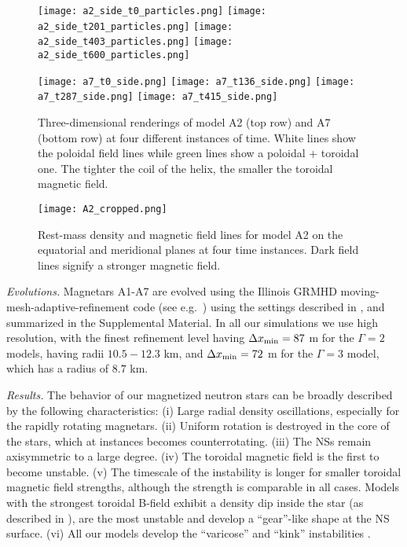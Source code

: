 \documentclass[twocolumn,superscriptaddress,showpacs,prl,aps,amsmath,amssymb,nofootinbib]{revtex4-1}
\begin{document}
\begin{figure*} 
\begin{center} 
\texttt{[image: a2\_side\_t0\_particles.png]}
\texttt{[image: a2\_side\_t201\_particles.png]}
\texttt{[image: a2\_side\_t403\_particles.png]}
\texttt{[image: a2\_side\_t600\_particles.png]}

\vspace{0.1cm}

\texttt{[image: a7\_t0\_side.png]}
\texttt{[image: a7\_t136\_side.png]}
\texttt{[image: a7\_t287\_side.png]}
\texttt{[image: a7\_t415\_side.png]}
\caption{Three-dimensional renderings of model A2 (top row) and A7 (bottom row)
at four different instances of time.  White lines show the poloidal field lines
while green lines show a poloidal + toroidal one. The tighter the coil of the
helix, the smaller the toroidal magnetic field.}
\label{fig:A27}
\end{center}
\end{figure*}


\begin{figure*} 
\begin{center}
\texttt{[image: A2\_cropped.png]}
\caption{Rest-mass density and magnetic field lines for model A2 on the
equatorial and meridional planes at four time instances. Dark field lines
signify a stronger magnetic field.}
\label{fig:A2}
\end{center}
\end{figure*}


\textit{Evolutions.}\textemdash
Magnetars A1-A7 are evolved using the Illinois GRMHD moving-mesh-adaptive-refinement
code (see e.g.~\cite{Etienne:2010ui}) using the settings described in
\cite{Ruiz:2020zaz}, and summarized in the Supplemental Material. In all our
simulations we use high resolution, with the finest refinement level having
$\Delta x_{\rm min}=87$ m for the $\Gamma=2$ models, having radii $10.5-12.3$
km, and $\Delta x_{\rm min}=72$ m for the $\Gamma=3$ model, which has a radius
of $8.7$ km. 


\textit{Results.}\textemdash
The behavior of our magnetized neutron stars can be broadly described by the
following characteristics: (i) Large radial density oscillations, especially
for the rapidly rotating magnetars. (ii) Uniform rotation is destroyed in the
core of the stars, which at instances becomes counterrotating. (iii) The NSs
remain axisymmetric to a large degree.  (iv) The toroidal magnetic field is the
first to become unstable.  (v) The timescale of the
instability is longer for smaller toroidal magnetic field strengths, although
the strength is comparable in all cases. Models with the strongest toroidal
B-field exhibit a density dip inside the star (as described in
\cite{Uryu:2019ckz}), are the most unstable and develop a ``gear''-like shape at
the NS surface. (vi) All our models develop the ``varicose'' and ``kink''
instabilities \cite{Markey1973,Tayler1973,Wright1973}. 
\end{document}
